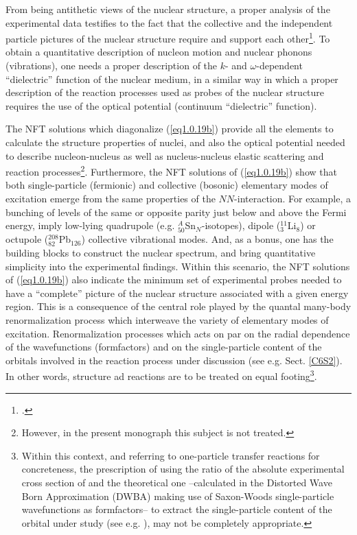 From being antithetic views of the nuclear structure, a proper analysis of the experimental data testifies to the fact that the collective and the independent particle pictures of the nuclear structure require and support each other\footnote{\cite{Bohr:75}.}. To obtain a quantitative description of nucleon  motion and nuclear phonons (vibrations), one needs a proper description of the $k$- and $\omega$-dependent ``dielectric'' function of the nuclear medium, in a similar way in which a proper description of the reaction processes used as probes of the nuclear structure requires the use of the optical potential (continuum ``dielectric'' function). 


The NFT solutions which diagonalize  (\ref{eq1.0.19b}) provide all the elements to calculate the structure properties of nuclei, and also the optical potential needed to describe nucleon-nucleus as well as nucleus-nucleus elastic scattering and reaction processes\footnote{However, in the present monograph this subject is not treated.}.
Furthermore, the NFT solutions of (\ref{eq1.0.19b}) show that both single-particle (fermionic) and collective (bosonic) elementary modes of excitation emerge from the same properties of the $NN$-interaction. For example, a bunching of levels of the same or opposite parity just below and above the Fermi energy, imply low-lying quadrupole (e.g. $^A_{50}$Sn$_{N}$-isotopes), dipole ($^{11}_3$Li$_8$) or octupole ($^{208}_{82}$Pb$_{126}$) collective vibrational modes. And, as a bonus, one has the building blocks to construct the nuclear spectrum, and bring quantitative simplicity into the experimental findings. Within this scenario, the NFT solutions of (\ref{eq1.0.19b}) also indicate the minimum set of experimental probes needed to have a ``complete'' picture of the nuclear structure associated with a given energy region. This is a consequence of the central role played by the quantal many-body renormalization process which interweave the variety of elementary modes of excitation.
Renormalization processes which acts on par on the radial dependence of the wavefunctions (formfactors) and on the single-particle content of the orbitals involved in the reaction process under discussion (see e.g. Sect. \ref{C6S2}). In other words, structure ad reactions are to be treated on equal footing\footnote{Within this context, and referring to one-particle transfer reactions for concreteness, the prescription of using the ratio of the absolute experimental cross section of and the theoretical one --calculated in the Distorted Wave Born Approximation (DWBA) making use of Saxon-Woods single-particle wavefunctions as formfactors-- to extract the single-particle content of the orbital under study (see e.g. \cite{Schiffer:12}), may not be completely appropriate.}. 


